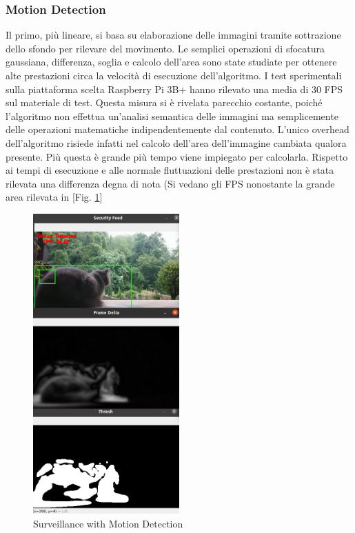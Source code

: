     \subsubsection{Motion Detection} Il primo, più lineare, si basa su elaborazione delle immagini tramite sottrazione dello sfondo per rilevare del movimento. Le semplici operazioni di sfocatura gaussiana, differenza, soglia e calcolo dell'area sono state studiate per ottenere alte prestazioni circa la velocità di esecuzione dell'algoritmo. 
    I test sperimentali sulla piattaforma scelta Raspberry Pi 3B+ hanno rilevato una media di 30 FPS sul materiale di test. Questa misura si è rivelata parecchio costante, poiché l'algoritmo non effettua un'analisi semantica delle immagini ma semplicemente delle operazioni matematiche indipendentemente dal contenuto. L'unico overhead dell'algoritmo risiede infatti nel calcolo dell'area dell'immagine cambiata qualora presente. Più questa è grande più tempo viene impiegato per calcolarla. Rispetto ai tempi di esecuzione e alle normale fluttuazioni delle prestazioni non è stata rilevata una differenza degna di nota (Si vedano gli FPS nonostante la grande area rilevata in [Fig. \ref{fig:MDcomparison}] 
    
    \begin{figure}[H]
        \caption{Surveillance with Motion Detection}
        \label{fig:MDcomparison}
        \centering
        \includegraphics[width=0.5\textwidth]{Images/MDcomparison.png}
    \end{figure}
    
